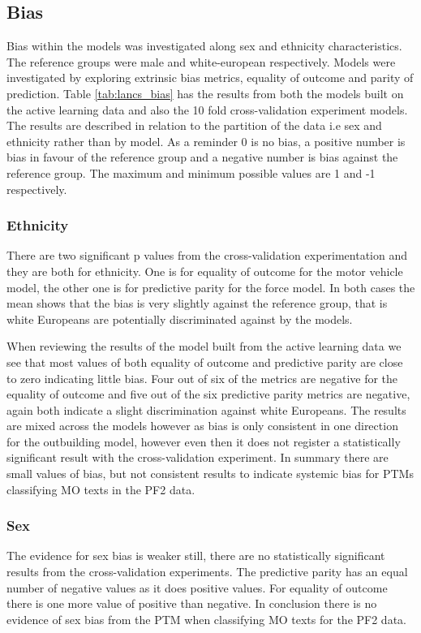 \subsection{Bias} Bias within the models was investigated along sex and ethnicity characteristics. The reference groups were male and white-european respectively. Models were investigated by exploring extrinsic bias metrics, equality of outcome and parity of prediction. Table \ref{tab:lancs_bias} has the results from both the models built on the active learning data and also the 10 fold cross-validation experiment models. The results are described in relation to the partition of the data i.e sex and ethnicity rather than by model. As a reminder 0 is no bias, a positive number is bias in favour of the reference group and a negative number is bias against the reference group. The maximum and minimum possible values are 1 and -1 respectively.

\subsubsection{Ethnicity} There are two significant p values from the cross-validation experimentation and they are both for ethnicity. One is for equality of outcome for the motor vehicle model, the other one is for predictive parity for the force model. In both cases the mean shows that the bias is very slightly against the reference group, that is white Europeans are potentially discriminated against by the models. 

When reviewing the results of the model built from the active learning data we see that most values of both equality of outcome and predictive parity are close to zero indicating little bias. Four out of six of the metrics are negative for the equality of outcome and five out of the six predictive parity metrics are negative, again both indicate a slight discrimination against white Europeans. The results are mixed across the models however as bias is only consistent in one direction for the outbuilding model, however even then it does not register a statistically significant result with the cross-validation experiment. In summary there are small values of bias, but not consistent results to indicate systemic bias for PTMs classifying MO texts in the PF2 data.
 
\subsubsection{Sex} The evidence for sex bias is weaker still, there are no statistically significant results from the cross-validation experiments. The predictive parity has an equal number of negative values as it does positive values. For equality of outcome there is one more value of positive than negative. In conclusion there is no evidence of sex bias from the PTM when classifying MO texts for the PF2 data.

